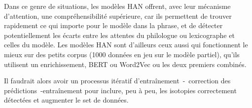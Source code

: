 Dans ce genre de situations, les modèles HAN offrent, avec leur mécanisme d'attention, une compréhensibilité supérieure, car ils permettent de trouver rapidement ce qui importe pour le modèle dans la phrase, et de détecter potentiellement les écarts entre les attentes du philologue ou lexicographe et celles du modèle. Les modèles HAN sont d'ailleurs ceux aussi qui fonctionnent le mieux sur des petits corpus (1000 données en jeu sur le modèle partiel), qu'ils utilisent un enrichissement, BERT ou Word2Vec ou les deux premiers combinés.

Il faudrait alors avoir un processus itératif d'entraînement~-~correction des prédictions~-entraînement pour inclure, peu à peu, les isotopies correctement détectées et augmenter le set de données.